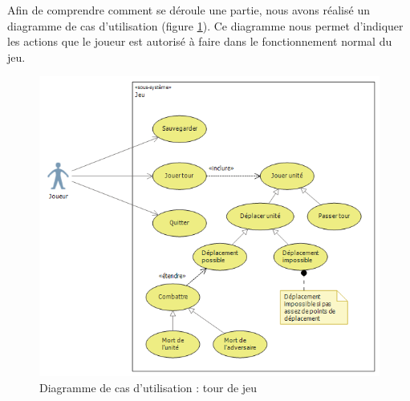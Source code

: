 Afin de comprendre comment se déroule  une partie, nous avons réalisé un diagramme de cas d'utilisation (figure \ref{fig:cdu_TourDeJeu}). Ce diagramme nous permet d'indiquer les actions que le joueur est autorisé à faire dans le fonctionnement normal du jeu.
\begin{figure}[!h]
\centering
\includegraphics[width=\textwidth]{Parties/Images/cdu_TourDeJeu.png}
\caption{Diagramme de cas d'utilisation : tour de jeu}
\label{fig:cdu_TourDeJeu}
\end{figure}
